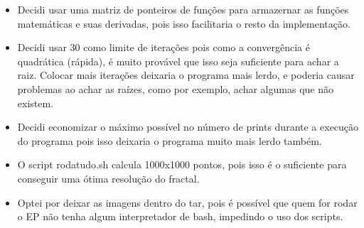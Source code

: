\documentclass[12pt]{article}
\begin{document}
\begin{itemize}
  
\item Decidi usar uma matriz de ponteiros de funções para armazernar as funções matemáticas e suas derivadas, pois isso facilitaria o resto da implementação.
\item Decidi usar 30 como limite de iterações pois como a convergência é quadrática (rápida), é muito provável que isso seja suficiente para achar a raiz. Colocar mais iterações deixaria o programa mais lerdo, e poderia causar problemas ao achar as raízes, como por exemplo, achar algumas que não existem.
\item Decidi economizar o máximo possível no número de prints durante a execução do programa pois isso deixaria o programa muito mais lerdo também.
\item O script rodatudo.sh calcula 1000x1000 pontos, pois isso é o suficiente para conseguir uma ótima resolução do fractal.
\item Optei por deixar as imagens dentro do tar, pois é possível que quem for rodar o EP não tenha algum interpretador de bash, impedindo o uso dos scripts.
  
\end{itemize}
\end{document}
